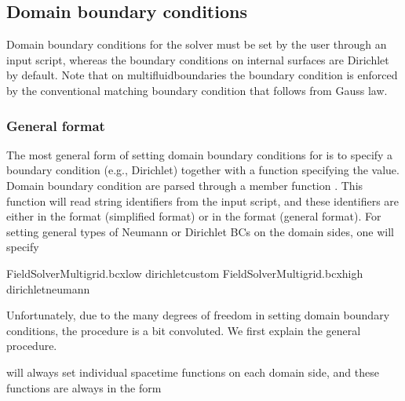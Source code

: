 \documentclass[letterpaper,10pt,english]{sphinxmanual}
\begin{document}
\subsection{Domain boundary conditions}
\label{\detokenize{Solvers/Electrostatics:domain-boundary-conditions}}\label{\detokenize{Solvers/Electrostatics:chap-poissondomainbc}}
\sphinxAtStartPar
Domain boundary conditions for the solver must be set by the user through an input script, whereas the boundary conditions on internal surfaces are Dirichlet by default.
Note that on multifluid\sphinxhyphen{}boundaries the boundary condition is enforced by the conventional matching boundary condition that follows from Gauss\textasciigrave{} law.


\subsubsection{General format}
\label{\detokenize{Solvers/Electrostatics:general-format}}
\sphinxAtStartPar
The most general form of setting domain boundary conditions for  is to specify a boundary condition  (e.g., Dirichlet) together with a function specifying the value.
Domain boundary condition  are parsed through a member function .
This function will read string identifiers from the input script, and these identifiers are either in the format  (simplified format) or in the format  (general format).
For setting general types of Neumann or Dirichlet BCs on the domain sides, one will specify

\begin{sphinxVerbatim}[commandchars=\\\{\},formatcom=\scriptsize]
FieldSolverMultigrid.bc\PYGZus{}x\PYGZus{}low   dirichlet\PYGZus{}custom
FieldSolverMultigrid.bc\PYGZus{}x\PYGZus{}high  dirichlet\PYGZus{}neumann
\end{sphinxVerbatim}

\sphinxAtStartPar
Unfortunately, due to the many degrees of freedom in setting domain boundary conditions, the procedure is a bit convoluted.
We first explain the general procedure.

\sphinxAtStartPar
{} will always set individual space\sphinxhyphen{}time functions on each domain side, and these functions are always in the form
\end{document}
